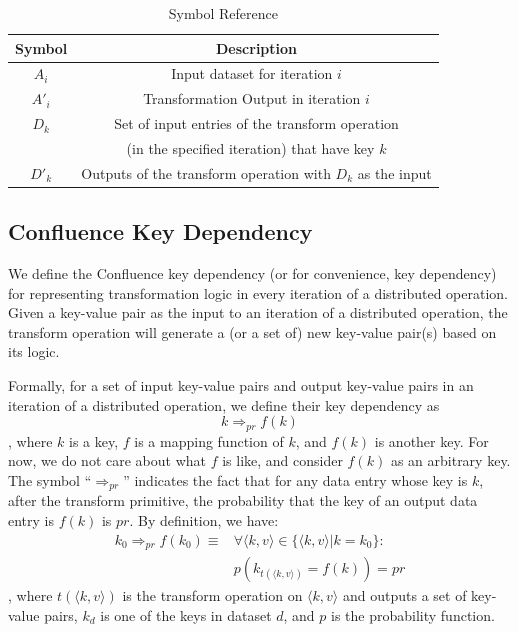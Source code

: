 \documentclass[10pt,journal,compsoc]{IEEEtran}
\begin{document}
\begin{table}[!t]
\renewcommand{\arraystretch}{1}
\caption{Symbol Reference}\label{table:symbol}
\centering
\begin{tabularx}{0.49\textwidth}{ c | c }
\hline
\textbf{Symbol} & \textbf{Description}  \\
\hline
$A_i$ & Input dataset for iteration $i$\\
\hline
$A'_i$  & Transformation Output in iteration $i$   \\
\hline
$D_k$ & Set of input entries of the transform operation \\
&(in the specified iteration) that have key $k$\\
\hline
$D'_k$ & Outputs of the transform operation with $D_k$ as the input\\
\hline
\end{tabularx}
\end{table}

\subsection{Confluence Key Dependency}\label{section:dependency}
We define the Confluence key dependency (or for convenience, 
key dependency) %
for representing transformation logic in every iteration
of a distributed operation. 
Given a key-value pair as the input to an iteration of a distributed operation,
the transform operation will generate a (or a set of) new key-value pair(s) based on its logic. 


Formally, for a set of input key-value pairs and output key-value pairs 
in an iteration of a distributed operation, 
we define their key dependency as 
\begin{equation}\label{eq:dependency}
k \Rightarrow_{pr} f(k)
\end{equation}
, where $k$ is a key, 
$f$ is a mapping function of $k$, 
and $f(k)$ is another key. 
For now, we do not care about what $f$ is like, and consider $f(k)$
as an arbitrary key. 
The symbol ``$\Rightarrow_{pr}$'' indicates the fact that 
for any data entry whose key is $k$, after the transform primitive, 
the probability that the key of an output data entry is $f(k)$ is $pr$.
By definition, we have:
\begin{equation*}\label{eq:dependencyDefine}
\begin{aligned}
k_0 \Rightarrow_{pr} f(k_0) \equiv 
& \forall \langle k,v \rangle \in \{ \langle k,v \rangle | k = k_0\}: \\
& p(k_{t( \langle k,v \rangle)} = f(k)) = pr
\end{aligned}
\end{equation*}
, where $t(\langle k,v \rangle)$ is the transform operation on $\langle k,v \rangle$ and outputs 
a set of key-value pairs, $k_d$ is one of the keys in dataset $d$,
and $p$ is the probability function. 
\end{document}
